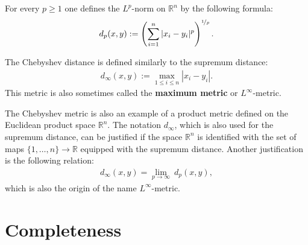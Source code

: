     \begin{example}[p-metric]\label{metric:p_metric}
        For every $p\geq1$ one defines the $L^p$-norm on $\mathbb{R}^n$ by the following formula:
        \begin{gather}
            d_p(x,y) := \left(\sum_{i=1}^n|x_i-y_i|^p\right)^{\nicefrac{1}{p}}.
        \end{gather}
    \end{example}
    \begin{example}\label{metric:chebyshev_distance}
        The Chebyshev distance is defined similarly to the supremum distance:
        \begin{gather}
            d_\infty(x,y) := \max_{1\leq i\leq n}|x_i - y_i|.
        \end{gather}
        This metric is also sometimes called the \textbf{maximum metric} or $L^\infty$-metric.
    \end{example}
    \begin{remark}
        The Chebyshev metric is also an example of a product metric defined on the Euclidean product space $\mathbb{R}^n$. The notation $d_\infty$, which is also used for the supremum distance, can be justified if the space $\mathbb{R}^n$ is identified with the set of maps $\{1,\ldots,n\}\rightarrow\mathbb{R}$ equipped with the supremum distance. Another justification is the following relation:
        \begin{gather}
            d_\infty(x,y) = \lim_{p\rightarrow\infty}\ d_p(x,y),
        \end{gather}
        which is also the origin of the name $L^\infty$-metric.
    \end{remark}

\section{Completeness}


